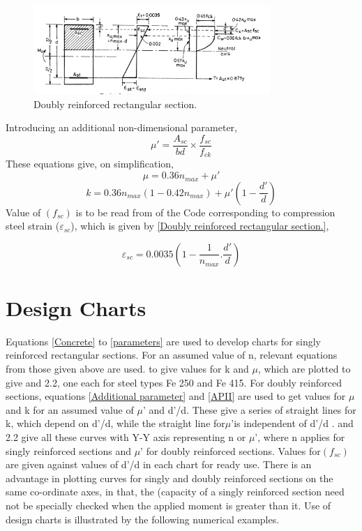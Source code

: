 \begin{figure}
\centering
\includegraphics[width=0.8\textwidth]{images/ch2-4.png}
\caption{Doubly reinforced rectangular section.}
\label{reinforced section}
\end{figure}
Introducing an additional non-dimensional parameter,
$$\mu' = \frac{A_{sc}}{bd} \times \frac{f_{sc}}{f_{ck}}$$
These equations give, on simplification,
\begin{equation}
\mu=0.36n_{max} + \mu'
\label{Additional parameter}
\end{equation}
\newpage
\begin{equation}
k=0.36n_{max}(1-0.42n_{max}) + \mu'(1-\frac{d'}{d})
\label{APII}
\end{equation}
Value of $(f_{sc})$ is to be read from  of the Code corresponding to compression steel strain
($\varepsilon_{sc}$), which is given by \fig \ref{Doubly reinforced rectangular section.},

\begin{equation}
\varepsilon_{sc} = 0.0035(1-\frac{1}{n_{max}}.\frac{d'}{d})
\label{Compression steel strain}
\end{equation}
\section{Design Charts}
Equations \eqn \ref{Concrete} to \eqn \ref{parameters} are used to develop charts for singly reinforced rectangular
sections. For an assumed value of n, relevant equations from those given above are used. to
give values for k and $\mu$, which are plotted to give  and 2.2, one each for steel types
Fe 250 and Fe 415. For doubly reinforced sections, equations \eqn \ref{Additional parameter} and \eqn \ref{APII} are used to get
values for $\mu$ and k for an assumed value of $\mu’$ and d'/d. These give a series of straight lines for
k, which depend on d'/d, while the straight line for$\mu’$is independent of d'/d .  and 2.2
give all these curves with Y-Y axis representing n or $\mu’$, where n applies for singly reinforced
sections and $\mu’$ for doubly reinforced sections. Values for$(f_{sc})$ are given against values of d'/d in
each chart for ready use. There is an advantage in plotting curves for singly and doubly
reinforced sections on the same co-ordinate axes, in that, the (capacity of a singly reinforced
section need not be specially checked when the applied moment is greater than it. Use of design
charts is illustrated by the following numerical examples.
